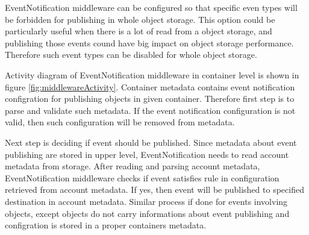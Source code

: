     EventNotification middleware can be configured so that specific even types will be forbidden for publishing in whole object storage. This option could be particularly useful when there is a lot of read from a object storage, and publishing those events cound have big impact on object storage performance. Therefore such event types can be disabled for whole object storage.

    Activity diagram of EventNotification middleware in container level is shown in figure \ref{fig:middlewareActivity}. Container metadata contains event notification configration for publishing objects in given container. Therefore first step is to parse and validate such metadata. If the event notification configuration is not valid, then such configuration will be removed from metadata.

    Next step is deciding if event should be published. Since metadata about event publishing are stored in upper level, EventNotification needs to read account metadata from storage. After reading and parsing account metadata, EventNotification middleware checks if event satisfies rule in configuration retrieved from account metadata. If yes, then event will be published to specified destination in account metadata. Similar process if done for events involving objects, except objects do not carry informations about event publishing and configration is stored in a proper containers metadata.

